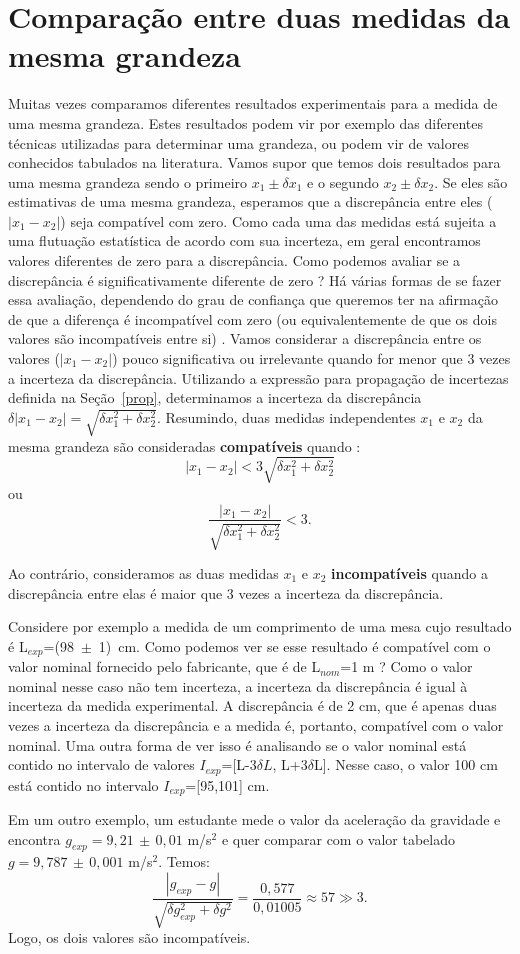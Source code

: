 \section*{Compara\c c\~ao entre duas medidas da mesma grandeza}
Muitas vezes comparamos diferentes resultados experimentais para a medida de uma mesma grandeza.  Estes resultados podem vir por exemplo das diferentes técnicas utilizadas para determinar uma grandeza, ou podem vir de valores conhecidos tabulados na literatura. Vamos supor que temos dois resultados para uma mesma grandeza sendo o primeiro $x_1 \pm \delta{x_1}$ e o segundo $x_2 \pm \delta{x_2}$.  Se eles são estimativas de uma mesma grandeza, esperamos que a discrepância entre eles ($|x_1-x_2|$) seja compatível com zero. Como cada uma das medidas está sujeita a uma flutuação estatística de acordo com sua incerteza, em geral encontramos valores diferentes de zero para a discrepância. Como podemos avaliar se a discrepância é significativamente diferente de zero ?  Há várias formas de se fazer essa avaliação, dependendo do grau de confiança que queremos ter na afirmação de que a diferença é incompatível com zero (ou equivalentemente de que os dois valores são incompatíveis entre si) . Vamos considerar a discrepância entre os valores ($|x_1-x_2|$) pouco significativa ou irrelevante quando for menor que 3 vezes a incerteza da discrepância. Utilizando a expressão para propagação de incertezas definida na Seção~\ref{prop}, determinamos a incerteza da discrepância $\delta |x_1-x_2|=\sqrt{\delta x^2_1+\delta x^2_2}$. Resumindo, duas medidas independentes $x_1$ e $x_2$ da mesma grandeza são consideradas {\bf  compatíveis} quando : 
$$|x_1 - x_2| < 3 \sqrt{\delta x^2_1+\delta x^2_2}$$ 
ou
$$\frac{|x_1 - x_2|}{\sqrt{\delta x^2_1+\delta x^2_2}}<3.$$

Ao contrário, consideramos as duas medidas $x_1$ e $x_2$ {\bf incompatíveis} quando a discrepância entre elas é maior que 3 vezes a incerteza da discrepância. 

 Considere por exemplo a medida de um comprimento de uma mesa cujo resultado é L$_{exp}$=(98~$\pm$~1)~cm. Como podemos ver se esse resultado é compatível com o valor nominal fornecido pelo fabricante, que é de L$_{nom}$=1 m ? 
Como o valor nominal nesse caso não tem incerteza, a incerteza  da discrepância é igual à incerteza da medida experimental. A discrepância é de 2 cm, que é apenas duas vezes a incerteza da discrepância e a medida é, portanto, compatível com o valor nominal. Uma outra forma de ver isso \'e analisando se o valor nominal est\'a contido no intervalo de valores $I_{exp}$=[L-3$\delta L$, L+3$\delta$L]. Nesse caso, o valor 100 cm est\'a contido no intervalo $I_{exp}$=[95,101] cm.

Em um outro exemplo, um estudante mede o valor da aceleração da gravidade e encontra $g_{exp}=9,21\,\pm\,0,01$ m/s$^2$ e quer comparar com o valor tabelado $g=9,787\,\pm\,0,001$ m/s$^2$. Temos:
$$\frac{|g_{exp} -g |}{\sqrt{\delta g^2_{exp}+\delta g^2}}=\frac{0,577}{0,01005}\approx 57\gg 3.$$
Logo, os dois valores são incompat\'iveis.


